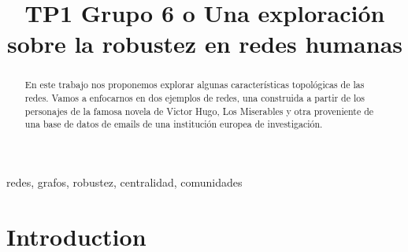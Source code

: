 \documentclass[conference]{IEEEtran}
\begin{document}
\title{TP1 Grupo 6
 o Una exploración sobre la robustez en redes humanas\\
{\footnotesize \textsuperscript{}}
}

\author{
\and
{}
\and
{}
\and
{}
}

\maketitle
\thispagestyle{fancy}

\begin{abstract}
En este trabajo nos proponemos explorar algunas características topológicas de las redes. Vamos a enfocarnos en dos ejemplos de redes, una construida a partir de los personajes de la famosa novela de Victor Hugo, Los Miserables y otra proveniente de una base de datos de emails de una institución europea de investigación.
 
\end{abstract}

\begin{IEEEkeywords}
redes, grafos, robustez, centralidad, comunidades
\end{IEEEkeywords}

\section{Introduction}
\end{document}
